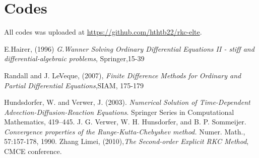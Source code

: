 \documentclass{article}
\theoremstyle{theorem}
\theoremstyle{definition}
\begin{document}
\section*{Codes}
All codes was uploaded at \href{https://github.com/hthtb22/rkc-elte}{https://github.com/hthtb22/rkc-elte}.
	\begin{thebibliography}{5}
		
		E.Hairer, (1996)  \textit{G.Wanner Solving Ordinary Differential Equations II - stiff and
		differential-algebraic problems}, Springer,15-39 
		
		
	Randall and J. LeVeque, (2007), \textit{Finite Difference Methods	for Ordinary and Partial Differential Equations},SIAM,	175-179	
		
		Hundsdorfer, W. and Verwer, J. (2003). \textit{Numerical Solution of Time-Dependent Advection-Diffusion-Reaction Equations}. Springer Series in Computational Mathematics, 419–445.
		J. G. Verwer, W. H. Hunsdorfer, and B. P. Sommeijer. \textit{Convergence properties
		of the Runge-Kutta-Chebyshev method.} Numer. Math., 57:157-178, 1990.
		Zhang Limei, (2010),\textit{The Second-order Explicit RKC Method}, CMCE conference.
		
	\end{thebibliography}
	
\end{document}
